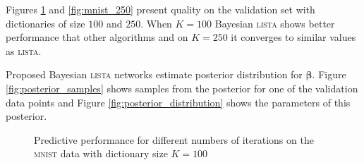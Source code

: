 \documentclass[letterpaper]{article}
\begin{document}
Figures \ref{fig:mnist_100} and \ref{fig:mnist_250} present quality on the validation set with dictionaries of size $100$ and $250$.  When $K=100$ Bayesian \textsc{lista} shows better performance that other algorithms and on $K=250$ it  converges to similar values as \textsc{lista}.

Proposed Bayesian \textsc{lista} networks estimate posterior distribution for $\boldsymbol\beta$. Figure \ref{fig:posterior_samples} shows samples from the posterior for one of the validation data points and Figure \ref{fig:posterior_distribution} shows the parameters of this posterior.

\begin{figure}[t]
\centering
\caption{Predictive performance for different numbers of iterations on the \textsc{mnist} data with dictionary size $K = 100$}
\label{fig:mnist_100}
\end{figure}
\end{document}
